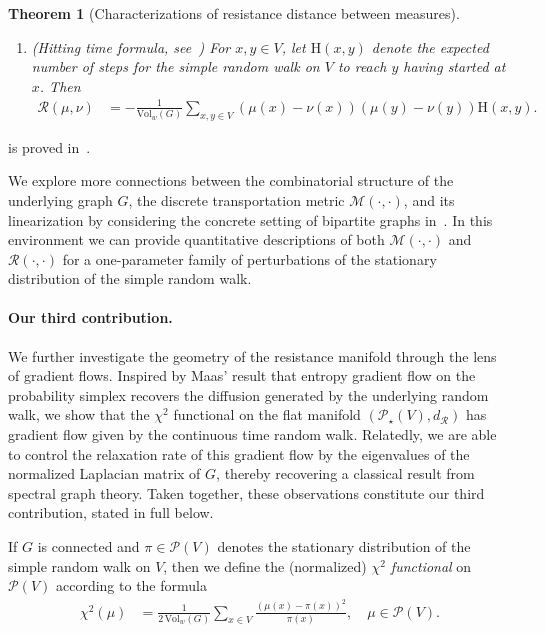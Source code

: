 \documentclass[11pt,a4paper]{article}
\newcommand{\Maas}{\mathcal{M}}
\newcommand{\Resis}{\mathcal{R}}
\newcommand{\Prob}{\mathscr{P}}
\newcommand{\Hitting}{\mathrm{H}}
\newcommand{\Vol}{\mathrm{Vol}}
\newtheorem{theorem}{Theorem}[section]
\begin{document}
\begin{theorem}[Characterizations of resistance distance between measures]
\begin{enumerate}
            \item \emph{(Hitting time formula, see~)} For $x, y\in V$, let $\Hitting(x, y)$ denote the expected number of steps for the simple random walk on $V$ to reach $y$ having started at $x$. Then
                \begin{align*}
                    \Resis (\mu,\nu) &= -\frac{1}{\Vol_w(G)} \sum_{x, y\in V}(\mu(x) - \nu(x)) (\mu(y) - \nu(y)) \Hitting(x, y).
                \end{align*}
        \end{enumerate}
\end{theorem}

 is proved in~. 

We explore more connections between the combinatorial structure of the underlying graph $G$, the discrete transportation metric $\Maas(\cdot,\cdot)$, and its linearization by considering the concrete setting of bipartite graphs in~. In this environment we can provide quantitative descriptions of both $\Maas(\cdot,\cdot)$ and $\Resis(\cdot,\cdot)$ for a one-parameter family of perturbations of the stationary distribution of the simple random walk.

\paragraph{Our third contribution.} We further investigate the geometry of the resistance manifold through the lens of gradient flows. Inspired by Maas' result that entropy gradient flow on the probability simplex recovers the diffusion generated by the underlying random walk, we show that the $\chi^{2}$ functional on the flat manifold $(\Prob_\star(V),d_\Resis)$ has gradient flow given by the continuous time random walk. Relatedly, we are able to control the relaxation rate of this gradient flow by the eigenvalues of the normalized Laplacian matrix of $G$, thereby recovering a classical result from spectral graph theory. Taken together, these observations constitute our third contribution, stated in full below.

If $G$ is connected and $\pi\in\Prob(V)$ denotes the stationary distribution of the simple random walk on $V$, then we define the (normalized) \emph{$\chi^2$ functional} on $\Prob(V)$ according to the formula
    \begin{align}\label{eq:chi2-functional-sec4}
        \chi^2(\mu) &= \frac{1}{2\,\Vol_w(G)}\sum_{x\in V} \frac{(\mu(x) - \pi(x))^2}{\pi(x)},\quad \mu\in\Prob(V).
    \end{align} 
\end{document}
